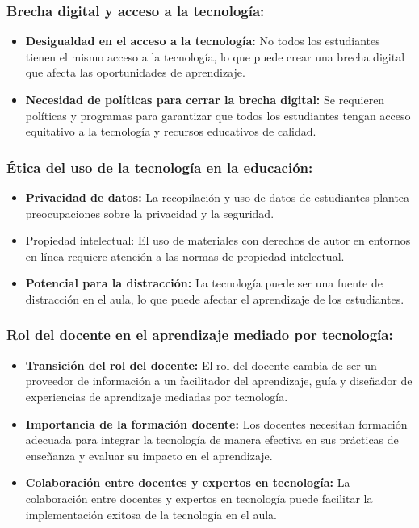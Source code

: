 \documentclass{article}
\begin{document}
\subsubsection{Brecha digital y acceso a la tecnología:}
\begin{itemize}
  \item \textbf{Desigualdad en el acceso a la tecnología:} No todos los estudiantes tienen el mismo acceso a la tecnología, lo que puede crear una brecha digital que afecta las oportunidades de aprendizaje.
  \item \textbf{Necesidad de políticas para cerrar la brecha digital:} Se requieren políticas y programas para garantizar que todos los estudiantes tengan acceso equitativo a la tecnología y recursos educativos de calidad.
\end{itemize}

\subsubsection{Ética del uso de la tecnología en la educación:}
\begin{itemize}
  \item \textbf{Privacidad de datos:} La recopilación y uso de datos de estudiantes plantea preocupaciones sobre la privacidad y la seguridad.
  \item Propiedad intelectual: El uso de materiales con derechos de autor en entornos en línea requiere atención a las normas de propiedad intelectual.
  \item \textbf{Potencial para la distracción:} La tecnología puede ser una fuente de distracción en el aula, lo que puede afectar el aprendizaje de los estudiantes.
\end{itemize}

\subsubsection{Rol del docente en el aprendizaje mediado por tecnología:}
\begin{itemize}
  \item \textbf{Transición del rol del docente:} El rol del docente cambia de ser un proveedor de información a un facilitador del aprendizaje, guía y diseñador de experiencias de aprendizaje mediadas por tecnología.
  \item \textbf{Importancia de la formación docente:} Los docentes necesitan formación adecuada para integrar la tecnología de manera efectiva en sus prácticas de enseñanza y evaluar su impacto en el aprendizaje.
  \item \textbf{Colaboración entre docentes y expertos en tecnología:} La colaboración entre docentes y expertos en tecnología puede facilitar la implementación exitosa de la tecnología en el aula.
\end{itemize}
\end{document}
